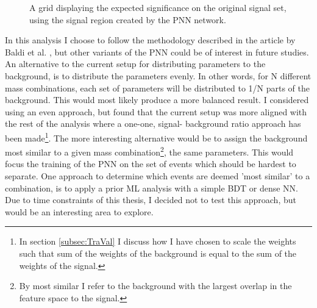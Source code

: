 \begin{figure} 
    \caption{A grid displaying the expected significance on the original signal set, using the signal region 
    created by the \acs{PNN} network.}
    \label{fig:PNNGridSig}
\end{figure}
In this analysis I choose to follow the methodology described in the article by Baldi et al. \cite{PNN}, but other variants of the \ac{PNN} could 
be of interest in future studies. An alternative to the current setup for distributing parameters to the background, is to distribute the parameters evenly. 
In other words, for N different mass combinations, each set of parameters will be distributed to 1/N parts of the background. This would most likely produce a
more balanced result. I considered using an even approach, but found that the current setup was more aligned with the rest of the analysis where a one-one, signal-
background ratio approach has been made\footnote{In section \ref{subsec:TraVal} I discuss how I have chosen to scale the weights such that sum of the weights of 
the background is equal to the sum of the weights of the signal.}. The more interesting alternative would be to assign the background most similar to a given mass 
combination\footnote{By most similar I refer to the background with the largest overlap in the feature space to the signal.}, the same parameters. This would 
focus the training of the \ac{PNN} on the set of events which should be hardest to separate. One approach to determine which events are deemed 'most similar' to a 
combination, is to apply a prior \ac{ML} analysis with a simple \ac{BDT} or dense \ac{NN}. Due to time constraints of this thesis, I decided not to test this 
approach, but would be an interesting area to explore.